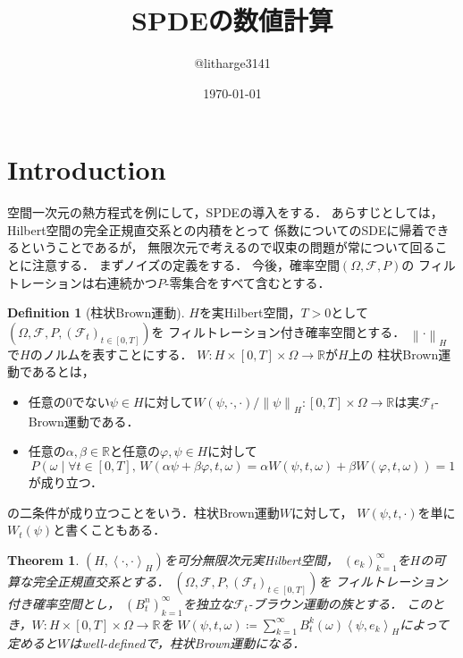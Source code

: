 \documentclass[dvipdfmx,autodetect-engine]{jsarticle}
\newtheorem{theorem}{Theorem}[section]
\theoremstyle{remark}
\theoremstyle{definition}
\newtheorem{definition}{Definition}[section]
\newcommand{\R}{\mathbb{R}}
\newcommand{\norm}[1]{\left\lVert#1\right\rVert}
\newcommand{\setmid}{\mathrel{} \middle| \mathrel{}}
\newcommand{\paren}[1]{\left( #1 \right)}
\newcommand{\iprod}[1]{\left\langle #1 \right\rangle}
\begin{document}
\title{SPDEの数値計算}
\author{@litharge3141}
\date{\today}
\maketitle

\section{Introduction}
空間一次元の熱方程式を例にして，SPDEの導入をする．
あらすじとしては，Hilbert空間の完全正規直交系との内積をとって
係数についてのSDEに帰着できるということであるが，
無限次元で考えるので収束の問題が常について回ることに注意する．
まずノイズの定義をする．
今後，確率空間$(\Omega,\mathcal{F},P)$の
フィルトレーションは右連続かつ$P$-零集合をすべて含むとする．


\begin{definition}[柱状Brown運動]
$H$を実Hilbert空間，$T>0$として
$(\Omega,\mathcal{F},P,(\mathcal{F}_{t})_{t\in [0,T]})$を
フィルトレーション付き確率空間とする．
$\norm{\cdot}_{H}$で$H$のノルムを表すことにする．
$W \colon H  \times [0,T] \times \Omega \to \R$が$H$上の
柱状Brown運動であるとは，
\begin{itemize}
    \item 任意の$0$でない$\psi \in H$に対して$W(\psi,\cdot,\cdot) / \norm{\psi}_{H}
    \colon [0,T]\times\Omega  \to \R$は実$\mathcal{F}_{t}$-Brown運動である．
    \item 任意の$\alpha,\beta \in \R$と任意の$\varphi,\psi \in H$に対して
    \begin{equation}
        P\paren{\omega \setmid \forall t \in [0,T],\,
        W(\alpha\psi + \beta\varphi,t,\omega) = 
    \alpha W(\psi,t,\omega) + \beta W(\varphi, t, \omega)} =1
    \end{equation}
    が成り立つ．
\end{itemize}
の二条件が成り立つことをいう．柱状Brown運動$W$に対して，
$W(\psi,t,\cdot)$を単に$W_{t}(\psi)$と書くこともある．
\end{definition}


\begin{theorem}
    $(H,\iprod{\cdot,\cdot}_{H})$を可分無限次元実Hilbert空間，
    $(e_{k})_{k=1}^{\infty}$を$H$の可算な完全正規直交系とする．
    $(\Omega,\mathcal{F},P,(\mathcal{F}_{t})_{t\in [0,T]})$を
    フィルトレーション付き確率空間とし，
    $(B_{t}^{n})_{k=1}^{\infty}$を独立な$\mathcal{F}_{t}$-ブラウン運動の族とする．
    このとき，$W \colon H \times [0,T]\times \Omega  \to \R$を
    $W(\psi,t,\omega) \coloneqq \sum_{k=1}^{\infty} B_{t}^{k}(\omega) \iprod{
    \psi, e_{k}}_{H}$によって定めると$W$はwell-definedで，柱状Brown運動になる．
\end{theorem}
\end{document}
